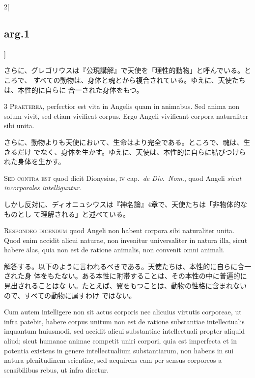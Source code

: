 \documentclass[paper=a4paper,fontsize=10pt,jafontsize=9pt,titlepage]{jlreq}
\begin{document}
\begin{paracol}{2}[\subsection{arg.1}]
\switchcolumn

さらに、グレゴリウスは『公現講解』で天使を「理性的動物」と呼んでいる。ところで、
すべての動物は、身体と魂とから複合されている。ゆえに、天使たちは、本性的に自らに
合一された身体をもつ。


{\scshape 3 Praeterea}, perfectior est vita in Angelis quam in animabus. Sed
anima non solum vivit, sed etiam vivificat corpus. Ergo Angeli vivificant
corpora naturaliter sibi unita.

\switchcolumn

さらに、動物よりも天使において、生命はより完全である。ところで、魂は、生きるだけ
でなく、身体を生かす。ゆえに、天使は、本性的に自らに結びつけられた身体を生かす。

\switchcolumn*[\subsection{s.c.}]

{\scshape Sed contra est} quod dicit Dionysius, {\scshape iv} cap.~{\itshape de
Div.~Nom}., quod Angeli {\itshape sicut incorporales intelliguntur}.

\switchcolumn

しかし反対に、ディオニュシウスは『神名論』4章で、天使たちは「非物体的なものとし
て理解される」と述べている。


{\scshape Respondeo dicendum} quod Angeli non habent corpora sibi naturaliter
unita. Quod enim accidit alicui naturae, non invenitur universaliter in natura
illa, sicut habere \={a}las, quia non est de ratione animalis, non convenit omni
animali.

\switchcolumn

解答する。以下のように言われるべきである。天使たちは、本性的に自らに合一された身
体をもたない。ある本性に附帯することは、その本性の中に普遍的に見出されることはな
い。たとえば、翼をもつことは、動物の性格に含まれないので、すべての動物に属すわけ
ではない。

\switchcolumn*

Cum autem intelligere non sit actus corporis nec alicuius virtutis corporeae, ut
infra patebit, habere corpus unitum non est de ratione substantiae
intellectualis inquantum huiusmodi, sed accidit alicui substantiae intellectuali
propter aliquid aliud; sicut humanae animae competit uniri corpori, quia est
imperfecta et in potentia existens in genere intellectualium substantiarum, non
habens in sui natura plenitudinem scientiae, sed acquirens eam per sensus
corporeos a sensibilibus rebus, ut infra dicetur.


\end{paracol}
\end{document}
